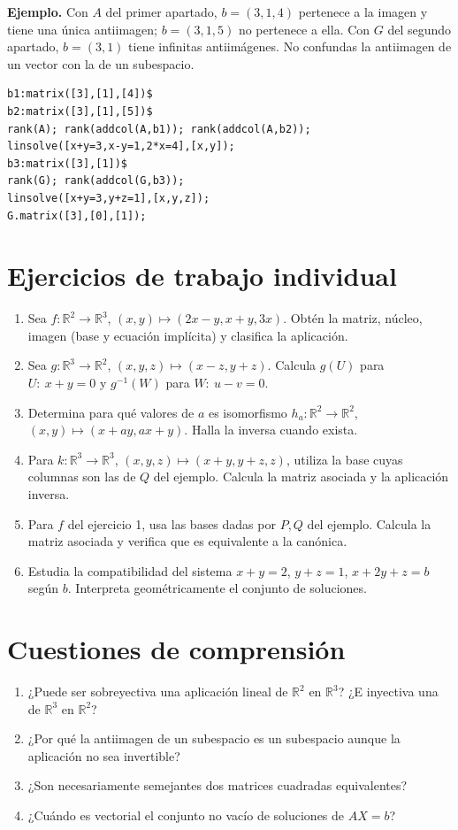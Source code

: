 \documentclass[12pt,a4paper]{article}
\begin{document}
\textbf{Ejemplo.} Con $A$ del primer apartado, $b=(3,1,4)$ pertenece a la imagen y tiene una única antiimagen; $b=(3,1,5)$ no pertenece a ella. Con $G$ del segundo apartado, $b=(3,1)$ tiene infinitas antiimágenes. No confundas la antiimagen de un vector con la de un subespacio.
\begin{lstlisting}
b1:matrix([3],[1],[4])$
b2:matrix([3],[1],[5])$
rank(A); rank(addcol(A,b1)); rank(addcol(A,b2));
linsolve([x+y=3,x-y=1,2*x=4],[x,y]);
b3:matrix([3],[1])$
rank(G); rank(addcol(G,b3));
linsolve([x+y=3,y+z=1],[x,y,z]);
G.matrix([3],[0],[1]);
\end{lstlisting}
\section{Ejercicios de trabajo individual}\begin{enumerate}
\item Sea $f:\mathbb R^2\to\mathbb R^3$, $(x,y)\mapsto(2x-y,x+y,3x)$. Obtén la matriz, núcleo, imagen (base y ecuación implícita) y clasifica la aplicación.
\item Sea $g:\mathbb R^3\to\mathbb R^2$, $(x,y,z)\mapsto(x-z,y+z)$. Calcula $g(U)$ para $U:\ x+y=0$ y $g^{-1}(W)$ para $W:\ u-v=0$.
\item Determina para qué valores de $a$ es isomorfismo $h_a:\mathbb R^2\to\mathbb R^2$, $(x,y)\mapsto(x+ay,ax+y)$. Halla la inversa cuando exista.
\item Para $k:\mathbb R^3\to\mathbb R^3$, $(x,y,z)\mapsto(x+y,y+z,z)$, utiliza la base cuyas columnas son las de $Q$ del ejemplo. Calcula la matriz asociada y la aplicación inversa.
\item Para $f$ del ejercicio 1, usa las bases dadas por $P,Q$ del ejemplo. Calcula la matriz asociada y verifica que es equivalente a la canónica.
\item Estudia la compatibilidad del sistema $x+y=2$, $y+z=1$, $x+2y+z=b$ según $b$. Interpreta geométricamente el conjunto de soluciones.
\end{enumerate}
\section{Cuestiones de comprensión}
\begin{enumerate}
\item ¿Puede ser sobreyectiva una aplicación lineal de $\mathbb R^2$ en $\mathbb R^3$? ¿E inyectiva una de $\mathbb R^3$ en $\mathbb R^2$?
\item ¿Por qué la antiimagen de un subespacio es un subespacio aunque la aplicación no sea invertible?
\item ¿Son necesariamente semejantes dos matrices cuadradas equivalentes?
\item ¿Cuándo es vectorial el conjunto no vacío de soluciones de $AX=b$?
\end{enumerate}
\end{document}
